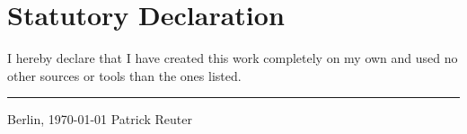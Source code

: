 \chapter*{\LARGE Statutory Declaration}
I hereby declare that I have created this work completely on my own and used no other sources or tools than the ones listed.
\vspace{2em}

\noindent

\vspace{30 mm}
\begin{flushright}

\rule{90mm}{1pt}

Berlin, \today \hspace{15 mm} Patrick Reuter
\end{flushright}
